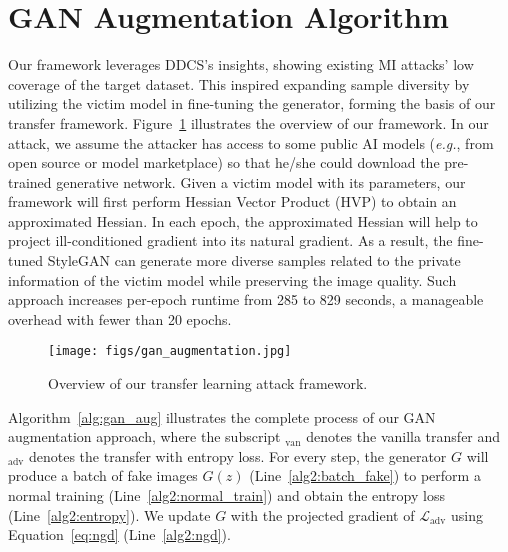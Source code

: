 \section{GAN Augmentation Algorithm}
Our framework leverages DDCS's insights, showing existing MI attacks’ low coverage of the target dataset. This inspired expanding sample diversity by utilizing the victim model in fine-tuning the generator, forming the basis of our transfer framework.
Figure~\ref{fig:overview_gan_augmentation} illustrates the overview of our framework. In our attack, we assume the attacker has access to some public AI models (\emph{e.g.}, from open source or model marketplace) so that he/she could download the pre-trained generative network. Given a victim model with its parameters, our framework will first perform Hessian Vector Product (HVP) to obtain an approximated Hessian. In each epoch, the approximated Hessian will help to project ill-conditioned gradient into its natural gradient. As a result, the fine-tuned StyleGAN can generate more diverse samples related to the private information of the victim model while preserving the image quality. Such approach increases per-epoch runtime from 285 to 829 seconds, a manageable overhead with fewer than 20 epochs.

\begin{figure}[htb]
	\centering
	\texttt{[image: figs/gan\_augmentation.jpg]}
	\caption{Overview of our transfer learning attack framework.}
	\label{fig:overview_gan_augmentation}
\end{figure}

Algorithm~\ref{alg:gan_aug} illustrates the complete process of our GAN augmentation approach, where the subscript $_{\text{van}}$ denotes the vanilla transfer and $_{\text{adv}}$ denotes the transfer with entropy loss.
For every step, the generator $G$ will produce a batch of fake images $G(z)$ (Line~\ref{alg2:batch_fake}) to perform a normal training (Line~\ref{alg2:normal_train}) and obtain the entropy loss (Line~\ref{alg2:entropy}).
We update $G$ with the projected gradient of $\mathcal{L}_{\text{adv}}$ using Equation~\ref{eq:ngd} (Line~\ref{alg2:ngd}).


